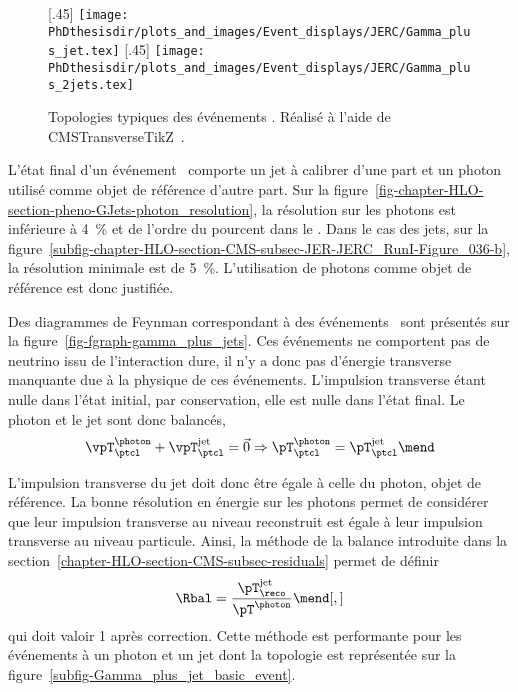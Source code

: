 \begin{figure}[p]
\centering
{}[.45\textwidth]
{\texttt{[image: \\PhDthesisdir/plots\_and\_images/Event\_displays/JERC/Gamma\_plus\_jet.tex]}}
\hfill
{}[.45\textwidth]
{\texttt{[image: \\PhDthesisdir/plots\_and\_images/Event\_displays/JERC/Gamma\_plus\_2jets.tex]}}
\caption[Topologies typiques des événements \Gjets.]{Topologies typiques des événements \Gjets. Réalisé à l'aide de CMSTransverseTikZ~\cite{CMSTransverseTikZ}.}
\label{fig-Gamma_plus_jet_events}
\end{figure}
L'état final d'un événement \Gjets\ comporte un jet à calibrer d'une part et un photon utilisé comme objet de référence d'autre part.
Sur la figure~\ref{fig-chapter-HLO-section-pheno-GJets-photon_resolution}, la résolution sur les photons est inférieure à \SI{4}{\%} et de l'ordre du pourcent dans le \CMSbarrel. Dans le cas des jets, sur la figure~\ref{subfig-chapter-HLO-section-CMS-subsec-JER-JERC_RunI-Figure_036-b}, la résolution minimale est de \SI{5}{\%}.
L'utilisation de photons comme objet de référence est donc justifiée.
\par Des diagrammes de Feynman correspondant à des événements \Gjets\ sont présentés sur la figure~\ref{fig-fgraph-gamma_plus_jets}.
Ces événements ne comportent pas de neutrino issu de l'interaction dure, il n'y a donc pas d'énergie transverse manquante due à la physique de ces événements.
L'impulsion transverse étant nulle dans l'état initial, par conservation, elle est nulle dans l'état final. Le photon et le jet sont donc balancés, \ie
\begin{equation}
\vpT_\ptcl^{\photon} + \vpT_\ptcl^\text{jet} = \vec{0}
\Rightarrow
\pT_\ptcl^{\photon} = \pT_\ptcl^\text{jet}
\mend
\end{equation}
\par L'impulsion transverse du jet doit donc être égale à celle du photon, objet de référence.
La bonne résolution en énergie sur les photons permet de considérer que leur impulsion transverse au niveau reconstruit est égale à leur impulsion transverse au niveau particule.
Ainsi, la méthode de la balance introduite dans la section~\ref{chapter-HLO-section-CMS-subsec-residuals} permet de définir
\begin{equation}
\Rbal = \frac{\pT_\reco^\text{jet}}{\pT^{\photon}}
\mend[,]
\end{equation}
qui doit valoir 1 après correction.
Cette méthode est performante pour les événements à un photon et un jet dont la topologie est représentée sur la figure~\ref{subfig-Gamma_plus_jet_basic_event}.
